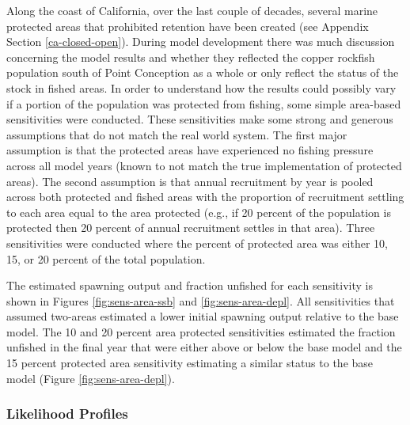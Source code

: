 \documentclass[11pt,
  english,
  a4paper,
]{article}
\begin{document}
Along the coast of California, over the last couple of decades, several marine protected areas that prohibited retention have been created (see Appendix Section \ref{ca-closed-open}). During model development there was much discussion concerning the model results and whether they reflected the copper rockfish population south of Point Conception as a whole or only reflect the status of the stock in fished areas. In order to understand how the results could possibly vary if a portion of the population was protected from fishing, some simple area-based sensitivities were conducted. These sensitivities make some strong and generous assumptions that do not match the real world system. The first major assumption is that the protected areas have experienced no fishing pressure across all model years (known to not match the true implementation of protected areas). The second assumption is that annual recruitment by year is pooled across both protected and fished areas with the proportion of recruitment settling to each area equal to the area protected (e.g., if 20 percent of the population is protected then 20 percent of annual recruitment settles in that area). Three sensitivities were conducted where the percent of protected area was either 10, 15, or 20 percent of the total population.

\leavevmode\tagmcend\tagstructend\par


The estimated spawning output and fraction unfished for each sensitivity is shown in Figures \ref{fig:sens-area-ssb} and \ref{fig:sens-area-depl}. All sensitivities that assumed two-areas estimated a lower initial spawning output relative to the base model. The 10 and 20 percent area protected sensitivities estimated the fraction unfished in the final year that were either above or below the base model and the 15 percent protected area sensitivity estimating a similar status to the base model (Figure \ref{fig:sens-area-depl}).

\leavevmode\tagmcend\tagstructend\par


\hypertarget{likelihood-profiles}{%
\subsubsection{Likelihood Profiles}\label{likelihood-profiles}}
\end{document}
